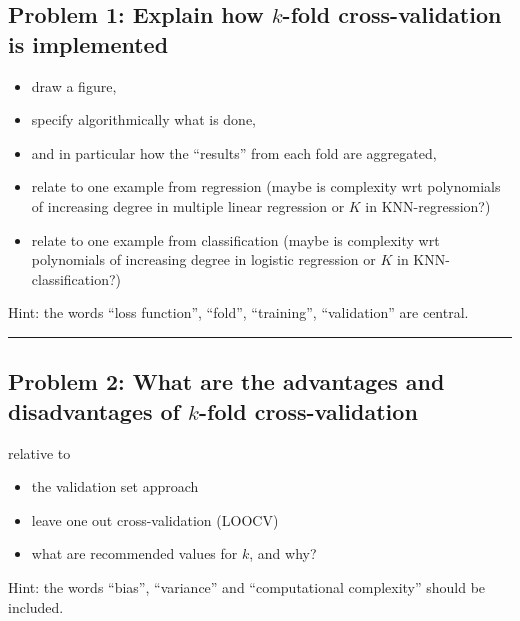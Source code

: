 \documentclass[]{article}
\providecommand{\tightlist}{%
  \setlength{\itemsep}{0pt}\setlength{\parskip}{0pt}}
\begin{document}
\subsection{\texorpdfstring{Problem 1: Explain how \(k\)-fold
cross-validation is
implemented}{Problem 1: Explain how k-fold cross-validation is implemented}}\label{problem-1-explain-how-k-fold-cross-validation-is-implemented}

\begin{itemize}
\tightlist
\item
  draw a figure,
\item
  specify algorithmically what is done,
\item
  and in particular how the ``results'' from each fold are aggregated,
\item
  relate to one example from regression (maybe is complexity wrt
  polynomials of increasing degree in multiple linear regression or
  \(K\) in KNN-regression?)
\item
  relate to one example from classification (maybe is complexity wrt
  polynomials of increasing degree in logistic regression or \(K\) in
  KNN-classification?)
\end{itemize}

Hint: the words ``loss function'', ``fold'', ``training'',
``validation'' are central.

\begin{center}\rule{0.5\linewidth}{\linethickness}\end{center}

\subsection{\texorpdfstring{Problem 2: What are the advantages and
disadvantages of \(k\)-fold
cross-validation}{Problem 2: What are the advantages and disadvantages of k-fold cross-validation}}\label{problem-2-what-are-the-advantages-and-disadvantages-of-k-fold-cross-validation}

relative to

\begin{itemize}
\tightlist
\item
  the validation set approach
\item
  leave one out cross-validation (LOOCV)
\item
  what are recommended values for \(k\), and why?
\end{itemize}

Hint: the words ``bias'', ``variance'' and ``computational complexity''
should be included.
\end{document}
